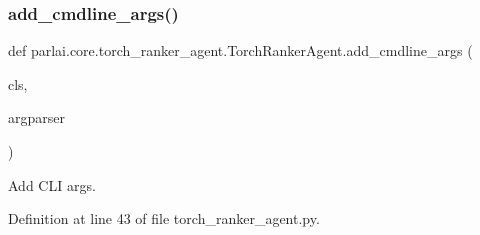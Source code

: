 \subsubsection{\texorpdfstring{add\+\_\+cmdline\+\_\+args()}{add\_cmdline\_args()}}
{\footnotesize\ttfamily def parlai.\+core.\+torch\+\_\+ranker\+\_\+agent.\+Torch\+Ranker\+Agent.\+add\+\_\+cmdline\+\_\+args (\begin{DoxyParamCaption}\item[{}]{cls,  }\item[{}]{argparser }\end{DoxyParamCaption})}

\begin{DoxyVerb}Add CLI args.
\end{DoxyVerb}
 

Definition at line 43 of file torch\+\_\+ranker\+\_\+agent.\+py.


